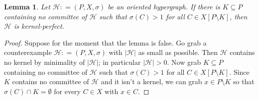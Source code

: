 \documentclass[12pt]{article}
\newtheorem{lemma}{Lemma}
\newcommand{\fancy}[1]{\mathcal{#1}}
\newcommand{\HH}{\fancy{H}}
\newcommand{\card}[1]{\left|#1\right|}
\newcommand{\brackets}[1]{\left[ #1 \right]}
\newcommand{\DefinedAs}{\mathrel{\mathop:}=}
\begin{document}
\begin{lemma}
Let $\HH \DefinedAs (P,X,\sigma)$ be an oriented hypergraph.  If there is $K \subseteq P$ containing no committee of $\HH$ 
such that $\sigma(C) > 1$ for all $C \in X\brackets{P \setminus K}$, then $\HH$ is kernel-perfect.
\end{lemma}
\begin{proof}
Suppose for the moment that the lemma is false.  Go grab a counterexample $\HH \DefinedAs (P,X,\sigma)$ with $\card{\HH}$ as small as possible.
Then $\HH$ contains no kernel by minimality of $\card{\HH}$; in particular $\card{\HH} > 0$. Now grab $K \subseteq P$ containing no committee of $\HH$ such that $\sigma(C) > 1$ for all $C \in X\brackets{P \setminus K}$.  Since $K$ contains no
committee of $\HH$ and it isn't a kernel, we can grab $x \in P\setminus K$ so that $\sigma(C) \cap K = \emptyset$ for every $C \in X$ with $x \in C$.  

\end{proof}
\end{document}
